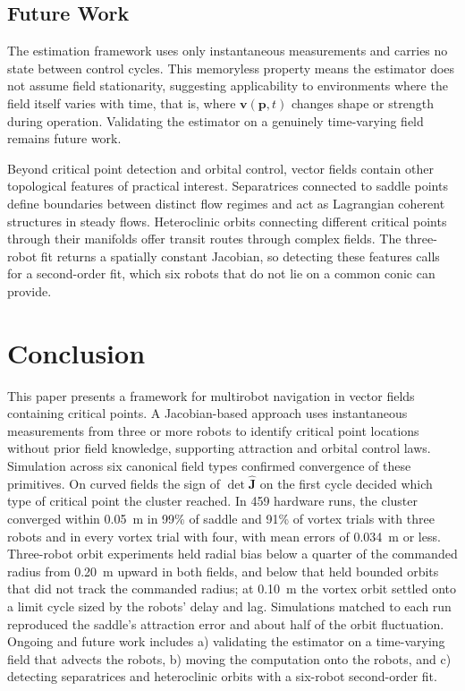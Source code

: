 \documentclass[lettersize,journal]{IEEEtran}
\newcommand{\rev}[1]{#1}
\begin{document}
\subsection{Future Work}

The estimation framework uses only instantaneous measurements and carries no state between control cycles. This memoryless property means the estimator does not assume field stationarity, suggesting applicability to environments where the field itself varies with time, that is, where $\mathbf{v}(\mathbf{p}, t)$ changes shape or strength during operation. Validating the estimator on a genuinely time-varying field remains future work.

Beyond critical point detection and orbital control, vector fields contain other topological features of practical interest. Separatrices connected to saddle points define boundaries between distinct flow regimes and act as Lagrangian coherent structures in steady flows. Heteroclinic orbits connecting different critical points through their manifolds offer transit routes through complex fields. The three-robot fit returns a spatially constant Jacobian, so detecting these features calls for a second-order fit, which six robots that do not lie on a common conic can provide.



\section{Conclusion}
\noindent

This paper presents a framework for multirobot navigation in vector fields containing critical points. A Jacobian-based approach uses instantaneous measurements from three or more robots to identify critical point locations without prior field knowledge, supporting attraction and orbital control laws. Simulation across six canonical field types confirmed convergence of these primitives. On curved fields the sign of $\det\hat{\mathbf{J}}$ on the first cycle decided which type of critical point the cluster reached. In \rev{459} hardware runs, the cluster converged within 0.05~m in \rev{99}\% of saddle and \rev{91}\% of vortex trials with three robots and in every vortex trial with four, with mean errors of \rev{0.034}~m or less. Three-robot orbit experiments held radial bias below a quarter of the commanded radius from \rev{0.20}~m upward in both fields, and below that held bounded orbits that did not track the commanded radius; at 0.10~m the vortex orbit settled onto a limit cycle sized by the robots' delay and lag. Simulations matched to each run reproduced the saddle's attraction error and about half of the orbit fluctuation.
Ongoing and future work includes a) validating the estimator on a time-varying field that advects the robots, b) moving the computation onto the robots, and c) detecting separatrices and heteroclinic orbits with a six-robot second-order fit.
\end{document}
